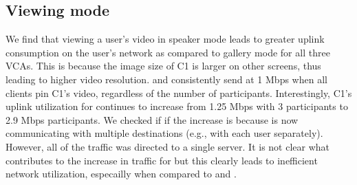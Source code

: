 \subsection{Viewing mode}
We find that viewing a user's video in speaker mode leads to greater uplink consumption on the user's network as compared to gallery mode for all three VCAs. This is because the image size of C1 is larger on other screens, thus leading to higher video resolution.  \zoom and \meet consistently send at 1 Mbps when all clients pin C1's video, regardless of the number of participants. Interestingly, C1's uplink utilization for \teams continues to increase from 1.25 Mbps with 3 participants to 2.9 Mbps participants. We checked if if the increase is because \teams is now communicating with multiple destinations (e.g., with each user separately). However, all of the traffic was directed to a single server. It is not clear what contributes to the increase in traffic for \teams but this clearly leads to inefficient network utilization, especailly when compared to \zoom and \meet. 

